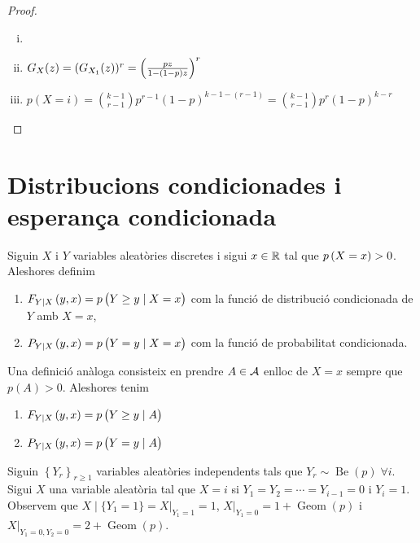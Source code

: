 \begin{proof}
    \begin{enumerate}[i)]
        \item[]
        \item $G_X(z) = (G_{X_1}(z))^r = \left( \frac{pz}{1-\left( 1-p\right) z}\right)^r$
        \item $p(X=i) = \binom{k-1}{r-1}p^{r-1}(1-p)^{k-1-(r-1)} = \binom{k-1}{r-1}p^{r}(1-p)^{k-r}$
    \end{enumerate}
\end{proof}

\section{Distribucions condicionades i esperança condicionada}

\begin{defi}
Siguin $X$ i $Y$ variables aleatòries discretes i sigui $x\in\mathbb{R}$ tal que $p\left( X=x\right) >0$. Aleshores definim
    \begin{enumerate}[1)]
        \item $F_{Y\vert X} \left( y,x\right)=p\left( Y\geq y\mid X=x \right)$ com la funció de distribució condicionada de $Y$ amb $X=x$,
        \item $P_{Y\vert X} \left( y,x\right)=p\left( Y = y\mid X=x \right)$ com la funció de probabilitat condicionada.
    \end{enumerate} 
\end{defi}

\begin{obs}
 Una definició anàloga consisteix en prendre $A\in\mathcal{A}$ enlloc de $X=x$ sempre que $p(A)>0$. Aleshores tenim
    \begin{enumerate}[1)]
        \item $F_{Y\vert X} \left( y,x\right)=p\left( Y\geq y\mid A \right)$
        \item $P_{Y\vert X} \left( y,x\right)=p\left( Y = y\mid A \right)$
    \end{enumerate} 
\end{obs}

\begin{example}
    Siguin $\left\{Y_r\right\}_{r\geq 1}$ variables aleatòries independents tals que $Y_r \sim \operatorname{Be}(p)\; \forall i$. Sigui $X$ una 
    variable aleatòria tal que $X=i$ si $Y_1 = Y_2 = \cdots = Y_{i-1}=0$ i $Y_i=1$. Observem que $X\mid\{Y_1=1\}= X\vert_{Y_1=1}=1$, 
    $X\vert_{Y_1=0}=1+\operatorname{Geom}(p)$ i $X\vert_{Y_1=0,Y_2=0}=2+\operatorname{Geom}(p)$.
\end{example}

